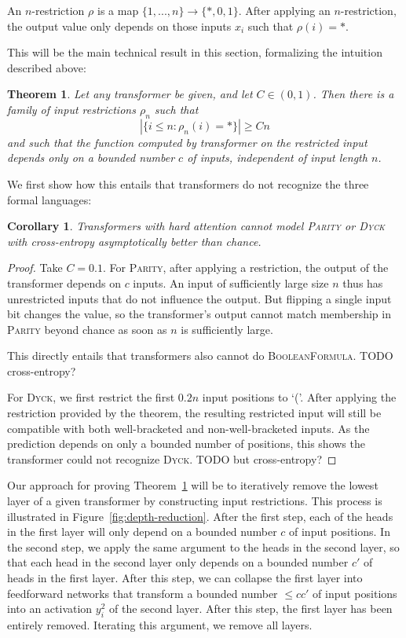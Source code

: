 \documentclass[11pt,a4paper]{article}
\newcounter{theorem}
\newtheorem{corollary}[theorem]{Corollary}
\newtheorem{thm}[theorem]{Theorem}
\begin{document}
An $n$-restriction $\rho$ is a map $\{1, ..., n\} \rightarrow \{*, 0, 1\}$.
After applying an $n$-restriction, the output value only depends on those inputs $x_i$ such that $\rho(i) = *$.

This will be the main technical result in this section, formalizing the intuition described above:
\begin{thm}\label{thm:hardmax-main}
Let any transformer be given, and let $C \in (0,1)$.
Then there is a family of input restrictions $\rho_n$ such that 
$$|\{i \leq n: \rho_n(i) = *\}| \geq Cn$$
and such that the function computed by transformer on the restricted input depends only on a bounded number $c$ of inputs, independent of input length $n$.
\end{thm}
We first show how this entails that transformers do not recognize the three formal languages:
\begin{corollary}
Transformers with hard attention cannot model \textsc{Parity} or \textsc{Dyck}
with cross-entropy asymptotically better than chance.
\end{corollary}
\begin{proof}
Take $C=0.1$.
For \textsc{Parity}, after applying a restriction, the output of the transformer depends on $c$ inputs.
An input of sufficiently large size $n$ thus has unrestricted inputs that do not influence the output.
But flipping a single input bit changes the value, so the transformer's output cannot match membership in \textsc{Parity} beyond chance as soon as $n$ is sufficiently large.

This directly entails that transformers also cannot do \textsc{BooleanFormula}.
TODO cross-entropy?

For \textsc{Dyck}, we first restrict the first $0.2n$ input positions to `('.
After applying the restriction provided by the theorem, the resulting restricted input will still be compatible with both well-bracketed and non-well-bracketed inputs.
As the prediction depends on only a bounded number of positions, this shows the transformer could not recognize \textsc{Dyck}.
TODO but cross-entropy?
\end{proof}

Our approach for proving Theorem~\ref{thm:hardmax-main} will be to iteratively remove the lowest layer of a given transformer by constructing input restrictions.
This process is illustrated in Figure~\ref{fig:depth-reduction}.
After the first step, each of the heads in the first layer will only depend on a bounded number $c$ of input positions.
In the second step, we apply the same argument to the heads in the second layer, so that each head in the second layer only depends on a bounded number $c'$ of heads in the first layer.
After this step, we can collapse the first layer into feedforward networks that transform a bounded number $\leq cc'$ of input positions into an activation $y_i^2$ of the second layer.
After this step, the first layer has been entirely removed.
Iterating this argument, we remove all layers.
\end{document}
